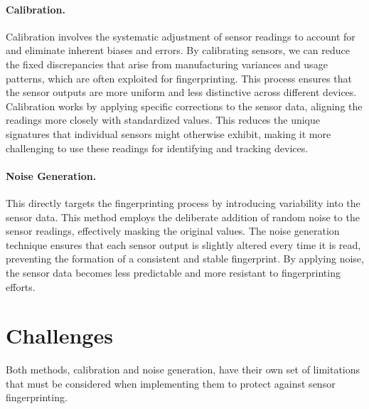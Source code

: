 \documentclass[11pt,
  oneside,openany,    %
]{scrreprt}
\begin{document}
\paragraph{Calibration.}
\label{par:calibration}
Calibration involves the systematic adjustment of sensor readings to account for and eliminate inherent biases and errors. 
By calibrating sensors, we can reduce the fixed discrepancies that arise from manufacturing variances and usage patterns, which are often exploited for fingerprinting. 
This process ensures that the sensor outputs are more uniform and less distinctive across different devices. 
Calibration works by applying specific corrections to the sensor data, aligning the readings more closely with standardized values. 
This reduces the unique signatures that individual sensors might otherwise exhibit, making it more challenging to use these readings for identifying and tracking devices.

\paragraph{Noise Generation.}
\label{par:noise}
This directly targets the fingerprinting process by introducing variability into the sensor data. 
This method employs the deliberate addition of random noise to the sensor readings, effectively masking the original values. 
The noise generation technique ensures that each sensor output is slightly altered every time it is read, preventing the formation of a consistent and stable fingerprint. 
By applying noise, the sensor data becomes less predictable and more resistant to fingerprinting efforts.

\section{Challenges}
\label{sec:challenges}
Both methods, calibration and noise generation, have their own set of limitations that must be considered when implementing them to protect against sensor fingerprinting.
\end{document}
